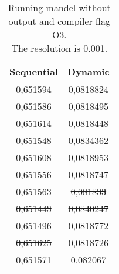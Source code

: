 \documentclass[a4paper]{article}
\begin{document}
	
	
	
\begin{table}
	\caption{Running mandel without output and compiler flag O3.\\The resolution is 0.001.}
	\label{table:mandel_nout_o3}
	\begin{center}
		\begin{tabular}{| c | c |}
			\hline
			Sequential & Dynamic\\ 
			\hline
			0,651594 & 0,0818824\\ 
			0,651586 & 0,0818495\\ 
			0,651614 & 0,0818448\\ 
			0,651548 & 0,0834362\\ 
			0,651608 & 0,0818953\\ 
			0,651556 & 0,0818747\\ 
			0,651563 & \st{0,081833}\\ 
			\st{0,651443} & \st{0,0840247}\\ 
			0,651496 & 0,0818772\\ 
			\st{0,651625} & 0,0818726\\ 
			\hline
			0,651571 & 0,082067\\ 
			\hline
		\end{tabular}
	\end{center}
\end{table}
	
\end{document}
